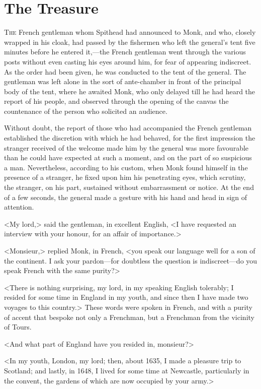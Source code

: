 \chapter{The Treasure}

\lettrine{T}{he} French gentleman whom Spithead had announced to Monk, and who, closely wrapped in his cloak, had passed by the fishermen who left the general's tent five minutes before he entered it,—the French gentleman went through the various posts without even casting his eyes around him, for fear of appearing indiscreet. As the order had been given, he was conducted to the tent of the general. The gentleman was left alone in the sort of ante-chamber in front of the principal body of the tent, where he awaited Monk, who only delayed till he had heard the report of his people, and observed through the opening of the canvas the countenance of the person who solicited an audience.

Without doubt, the report of those who had accompanied the French gentleman established the discretion with which he had behaved, for the first impression the stranger received of the welcome made him by the general was more favourable than he could have expected at such a moment, and on the part of so suspicious a man. Nevertheless, according to his custom, when Monk found himself in the presence of a stranger, he fixed upon him his penetrating eyes, which scrutiny, the stranger, on his part, sustained without embarrassment or notice. At the end of a few seconds, the general made a gesture with his hand and head in sign of attention.

<My lord,> said the gentleman, in excellent English, <I have requested an interview with your honour, for an affair of importance.>

<Monsieur,> replied Monk, in French, <you speak our language well for a son of the continent. I ask your pardon—for doubtless the question is indiscreet—do you speak French with the same purity?>

<There is nothing surprising, my lord, in my speaking English tolerably; I resided for some time in England in my youth, and since then I have made two voyages to this country.> These words were spoken in French, and with a purity of accent that bespoke not only a Frenchman, but a Frenchman from the vicinity of Tours.

<And what part of England have you resided in, monsieur?>

<In my youth, London, my lord; then, about 1635, I made a pleasure trip to Scotland; and lastly, in 1648, I lived for some time at Newcastle, particularly in the convent, the gardens of which are now occupied by your army.>

